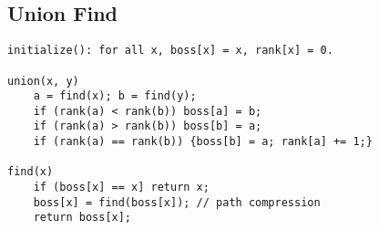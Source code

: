 \subsection{Union Find}
\begin{lstlisting}
initialize(): for all x, boss[x] = x, rank[x] = 0. 

union(x, y)
	a = find(x); b = find(y);
	if (rank(a) < rank(b)) boss[a] = b;
	if (rank(a) > rank(b)) boss[b] = a;
	if (rank(a) == rank(b)) {boss[b] = a; rank[a] += 1;}

find(x)
	if (boss[x] == x] return x;
	boss[x] = find(boss[x]); // path compression
	return boss[x];

\end{lstlisting}
